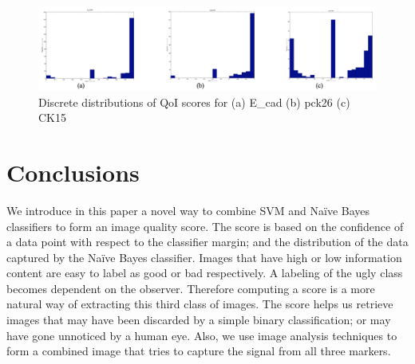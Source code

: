  \begin{figure}[H]
\centering
\includegraphics[width=1.0\textwidth]{img/ugly_distributions}
\caption{Discrete distributions of QoI scores for (a) E\_cad (b) pck26 (c) CK15}
\label{fig:ugly_distributions}
\end{figure}

\section{Conclusions}
We introduce in this paper a novel way to combine SVM and Naïve Bayes classifiers to form an image quality score.  The score is based on the confidence of a data point with respect to the classifier margin; and the distribution of the data captured by the Naïve Bayes classifier. Images that have high or low information content are easy to label as good or bad respectively. A labeling of the ugly class becomes dependent on the observer. Therefore computing a score is a more natural way of extracting this third class of images. The score helps us retrieve images that may have been discarded by a simple binary classification; or may have gone unnoticed by a human eye. Also, we use image analysis techniques to form a combined image that tries to capture the signal from all three markers.

